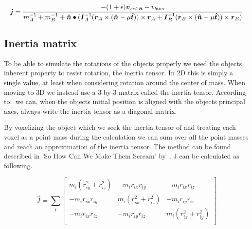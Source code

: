 \begin{equation}\label{eq:finalJ}
  \boldsymbol{j} = \frac{-(1+\epsilon)\boldsymbol{v}_{rel,\boldsymbol{\hat{n}}}-v_{bias}}
  {m_A^{-1}+m_B^{-1}+\boldsymbol{\hat{n}}\bullet(\boldsymbol{I}_A^{-1}(\boldsymbol{r}_A\times(\boldsymbol{\hat{n}}-\mu\boldsymbol{\hat{t}}))\times\boldsymbol{r}_A
  +\boldsymbol{I}_B^{-1}(\boldsymbol{r}_B\times(\boldsymbol{\hat{n}}-\mu\boldsymbol{\hat{t}}))\times\boldsymbol{r}_B)}
\end{equation}
%

\subsection{Inertia matrix}
To be able to simulate the rotations of the objects properly we need the objects
inherent property to resist rotation, the inertia tensor.
In 2D this is simply a single value, at least when considering rotation around
the center of mass. When moving to 3D we instead use a 3-by-3 matrix called the
inertia tensor. According to~\cite{ragnemalmscream} we can, when the objects initial
position is aligned with the objects principal axes, always write the inertia tensor
as a diagonal matrix.

By voxelizing the object which we seek the inertia tensor of and treating each voxel
as a point mass during the calculation we can sum over all the point masses and reach
an approximation of the inertia tensor. The method can be found described in
 'So How Can We Make Them Scream' by~\cite{ragnemalmscream}.
J can be calculated as following.

 \begin{equation}
  \vec{J} = \sum_i
  \begin{bmatrix}
    m_i(r_{iy}^2 + r_{iz}^2) & -m_ir_{ix}r_{iy} & -m_ir_{ix}r_{iz} \\
    -m_ir_{ix}r_{iy} & m_i(r_{ix}^2 + r_{iz}^2) & -m_ir_{iy}r_{iz} \\
    -m_ir_{ix}r_{iz} & -m_ir_{iy}r_{iz} & m_i(r_{ix}^2 + r_{iy}^2) \\
  \end{bmatrix}
 \end{equation}

